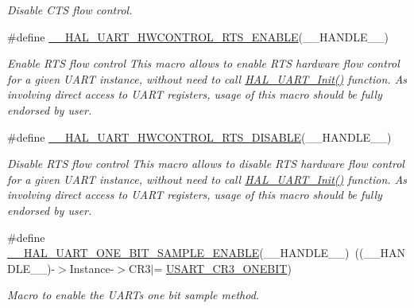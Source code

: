 \begin{DoxyCompactItemize}
\begin{DoxyCompactList}\small\item\em Disable C\+TS flow control. \end{DoxyCompactList}\item 
\#define \hyperlink{group___u_a_r_t___exported___macros_ga017ec9001ff33136f87cc4034b2709a6}{\+\_\+\+\_\+\+H\+A\+L\+\_\+\+U\+A\+R\+T\+\_\+\+H\+W\+C\+O\+N\+T\+R\+O\+L\+\_\+\+R\+T\+S\+\_\+\+E\+N\+A\+B\+LE}(\+\_\+\+\_\+\+H\+A\+N\+D\+L\+E\+\_\+\+\_\+)
\begin{DoxyCompactList}\small\item\em Enable R\+TS flow control This macro allows to enable R\+TS hardware flow control for a given U\+A\+RT instance, without need to call \hyperlink{group___u_a_r_t___exported___functions___group1_gabe47045024787099b0bfa82bbe7b0b6a}{H\+A\+L\+\_\+\+U\+A\+R\+T\+\_\+\+Init()} function. As involving direct access to U\+A\+RT registers, usage of this macro should be fully endorsed by user. \end{DoxyCompactList}\item 
\#define \hyperlink{group___u_a_r_t___exported___macros_ga8c034e96ad8f263cafeb5898ff7311fd}{\+\_\+\+\_\+\+H\+A\+L\+\_\+\+U\+A\+R\+T\+\_\+\+H\+W\+C\+O\+N\+T\+R\+O\+L\+\_\+\+R\+T\+S\+\_\+\+D\+I\+S\+A\+B\+LE}(\+\_\+\+\_\+\+H\+A\+N\+D\+L\+E\+\_\+\+\_\+)
\begin{DoxyCompactList}\small\item\em Disable R\+TS flow control This macro allows to disable R\+TS hardware flow control for a given U\+A\+RT instance, without need to call \hyperlink{group___u_a_r_t___exported___functions___group1_gabe47045024787099b0bfa82bbe7b0b6a}{H\+A\+L\+\_\+\+U\+A\+R\+T\+\_\+\+Init()} function. As involving direct access to U\+A\+RT registers, usage of this macro should be fully endorsed by user. \end{DoxyCompactList}\item 
\#define \hyperlink{group___u_a_r_t___exported___macros_ga3524747e5896296ab066d786431503ce}{\+\_\+\+\_\+\+H\+A\+L\+\_\+\+U\+A\+R\+T\+\_\+\+O\+N\+E\+\_\+\+B\+I\+T\+\_\+\+S\+A\+M\+P\+L\+E\+\_\+\+E\+N\+A\+B\+LE}(\+\_\+\+\_\+\+H\+A\+N\+D\+L\+E\+\_\+\+\_\+)~((\+\_\+\+\_\+\+H\+A\+N\+D\+L\+E\+\_\+\+\_\+)-\/$>$Instance-\/$>$C\+R3$\vert$= \hyperlink{group___peripheral___registers___bits___definition_ga9a96fb1a7beab602cbc8cb0393593826}{U\+S\+A\+R\+T\+\_\+\+C\+R3\+\_\+\+O\+N\+E\+B\+IT})
\begin{DoxyCompactList}\small\item\em Macro to enable the U\+A\+RT\textquotesingle{}s one bit sample method. \end{DoxyCompactList}\item 

\end{DoxyCompactItemize}
